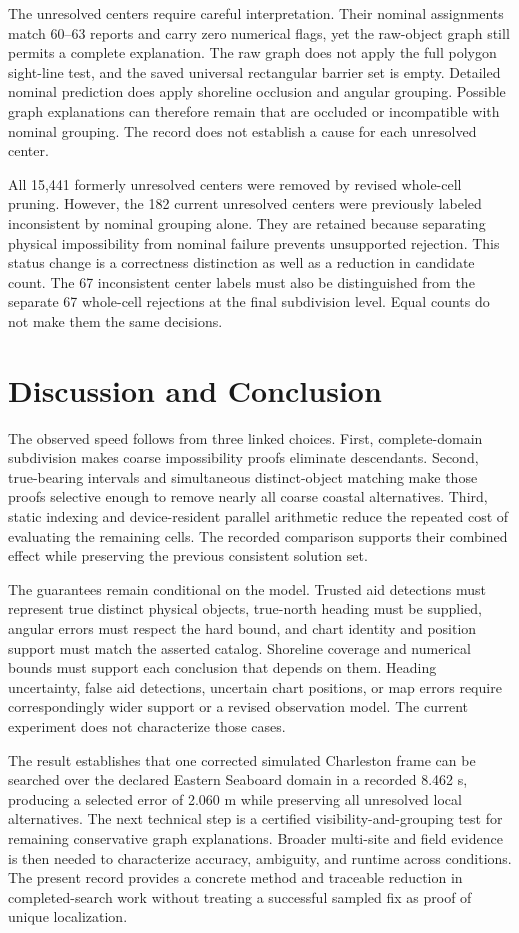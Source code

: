 \documentclass[conference]{IEEEtran}
\begin{document}
The unresolved centers require careful interpretation. Their nominal assignments match 60--63 reports and carry zero numerical flags, yet the raw-object graph still permits a complete explanation. The raw graph does not apply the full polygon sight-line test, and the saved universal rectangular barrier set is empty. Detailed nominal prediction does apply shoreline occlusion and angular grouping. Possible graph explanations can therefore remain that are occluded or incompatible with nominal grouping. The record does not establish a cause for each unresolved center.

All 15,441 formerly unresolved centers were removed by revised whole-cell pruning. However, the 182 current unresolved centers were previously labeled inconsistent by nominal grouping alone. They are retained because separating physical impossibility from nominal failure prevents unsupported rejection. This status change is a correctness distinction as well as a reduction in candidate count. The 67 inconsistent center labels must also be distinguished from the separate 67 whole-cell rejections at the final subdivision level. Equal counts do not make them the same decisions.

\section{Discussion and Conclusion}
The observed speed follows from three linked choices. First, complete-domain subdivision makes coarse impossibility proofs eliminate descendants. Second, true-bearing intervals and simultaneous distinct-object matching make those proofs selective enough to remove nearly all coarse coastal alternatives. Third, static indexing and device-resident parallel arithmetic reduce the repeated cost of evaluating the remaining cells. The recorded comparison supports their combined effect while preserving the previous consistent solution set.

The guarantees remain conditional on the model. Trusted aid detections must represent true distinct physical objects, true-north heading must be supplied, angular errors must respect the hard bound, and chart identity and position support must match the asserted catalog. Shoreline coverage and numerical bounds must support each conclusion that depends on them. Heading uncertainty, false aid detections, uncertain chart positions, or map errors require correspondingly wider support or a revised observation model. The current experiment does not characterize those cases.

The result establishes that one corrected simulated Charleston frame can be searched over the declared Eastern Seaboard domain in a recorded 8.462 s, producing a selected error of 2.060 m while preserving all unresolved local alternatives. The next technical step is a certified visibility-and-grouping test for remaining conservative graph explanations. Broader multi-site and field evidence is then needed to characterize accuracy, ambiguity, and runtime across conditions. The present record provides a concrete method and traceable reduction in completed-search work without treating a successful sampled fix as proof of unique localization.



\end{document}
